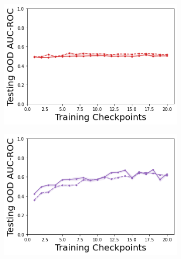 \begin{figure}
    \begin{subfigure}{.24\textwidth}
        \includegraphics[width=\textwidth]{sections/011_icml2022/resources/DropOut-AcrobotOOD-v0-AUC-ROC-epistemic_-testing-strategy.png}
    \end{subfigure}
    \begin{subfigure}{.24\textwidth}
        \includegraphics[width=\textwidth]{sections/011_icml2022/resources/Ensemble-AcrobotOOD-v0-AUC-ROC-epistemic_-testing-strategy.png}
    \end{subfigure}
    \begin{subfigure}{.24\textwidth}

\end{subfigure}
\end{figure}
